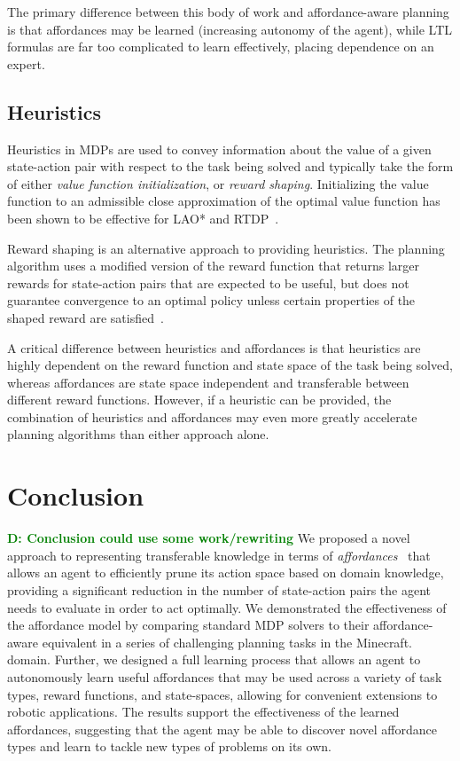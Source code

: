 \documentclass[conference]{IEEEtran}
\newcommand{\dnote}[1]{\textcolor{Green}{\textbf{D: #1}}}
\begin{document}
The primary difference between this body of work and affordance-aware planning is that affordances may be learned (increasing autonomy of the agent), while LTL formulas are far too complicated to learn effectively, placing dependence on an expert.

\subsection{Heuristics}
Heuristics in MDPs are used to convey information about the value of a given state-action pair with respect to the task being solved and typically take the form of either {\em value function initialization},
or {\em reward shaping}. Initializing the value function to an admissible close approximation of the optimal value function has been shown to be effective for LAO* and RTDP~\cite{Hansen:1999qf}.

Reward shaping is an alternative approach to providing heuristics. The planning algorithm uses a modified version of the reward function that returns larger rewards for state-action pairs that are expected to be useful, but does not guarantee convergence to an optimal policy unless certain properties of the shaped reward are satisfied~\cite{potshap}.

A critical difference between heuristics and affordances is that heuristics are highly dependent on the reward function and state space of the task being solved, whereas affordances are state space independent and transferable between different reward functions. However, if a heuristic can be provided, the combination of heuristics and affordances may even more greatly accelerate planning algorithms than either approach alone.


\section{Conclusion}
\label{sec:conclusion}
\dnote{Conclusion could use some work/rewriting}
We proposed a novel approach to representing transferable knowledge in terms of
{\em affordances}~\cite{gibson77} that allows an agent to efficiently
prune its action space based on domain knowledge,
providing a significant reduction in the number of state-action pairs the
agent needs to evaluate in order to act optimally. We demonstrated the effectiveness of the affordance model by comparing standard MDP solvers
to their affordance-aware equivalent in a series of challenging planning tasks in the Minecraft.
domain. Further, we designed a full learning process that allows an agent to autonomously learn useful affordances that may be used
across a variety of task types, reward functions, and state-spaces, allowing for convenient extensions to robotic applications.
The results support the effectiveness of the learned affordances, suggesting that the agent may be able to discover novel affordance types and learn to tackle new types of problems on its own.
\end{document}
